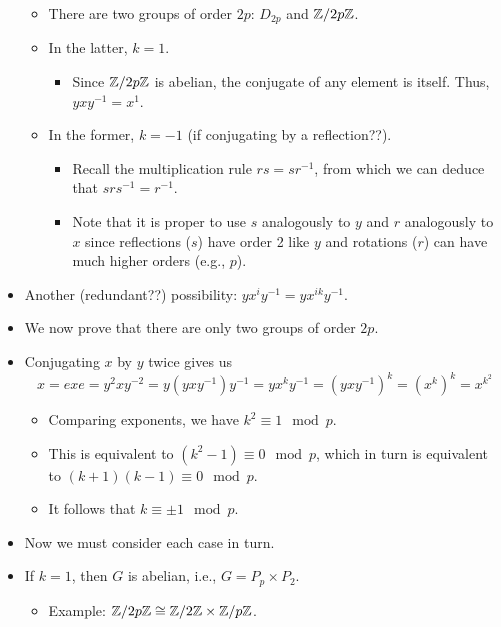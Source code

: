 \documentclass[../notes.tex]{subfiles}
\begin{document}
\begin{itemize}
    \begin{itemize}
        \item There are two groups of order $2p$: $D_{2p}$ and $\mathbb{Z}/2p\mathbb{Z}$.
        \item In the latter, $k=1$.
        \begin{itemize}
            \item Since $\mathbb{Z}/2p\mathbb{Z}$ is abelian, the conjugate of any element is itself. Thus, $yxy^{-1}=x^1$.
        \end{itemize}
        \item In the former, $k=-1$ (if conjugating by a reflection??).
        \begin{itemize}
            \item Recall the multiplication rule $rs=sr^{-1}$, from which we can deduce that $srs^{-1}=r^{-1}$.
            \item Note that it is proper to use $s$ analogously to $y$ and $r$ analogously to $x$ since reflections ($s$) have order 2 like $y$ and rotations ($r$) can have much higher orders (e.g., $p$).
        \end{itemize}
    \end{itemize}
    \item Another (redundant??) possibility: $yx^iy^{-1}=yx^{ik}y^{-1}$.
    \item We now prove that there are only two groups of order $2p$.
    \item Conjugating $x$ by $y$ twice gives us
    \begin{equation*}
        x = exe
        = y^2xy^{-2}
        = y(yxy^{-1})y^{-1}
        = yx^ky^{-1}
        = (yxy^{-1})^k
        = (x^k)^k
        = x^{k^2}
    \end{equation*}
    \begin{itemize}
        \item Comparing exponents, we have $k^2\equiv 1\mod p$.
        \item This is equivalent to $(k^2-1)\equiv 0\mod p$, which in turn is equivalent to $(k+1)(k-1)\equiv 0\mod p$.
        \item It follows that $k\equiv\pm 1\mod p$.
    \end{itemize}
    \item Now we must consider each case in turn.
    \item If $k=1$, then $G$ is abelian, i.e., $G=P_p\times P_2$.
    \begin{itemize}
        \item Example: $\mathbb{Z}/2p\mathbb{Z}\cong\mathbb{Z}/2\mathbb{Z}\times\mathbb{Z}/p\mathbb{Z}$.

\end{itemize}
\end{itemize}
\end{document}
